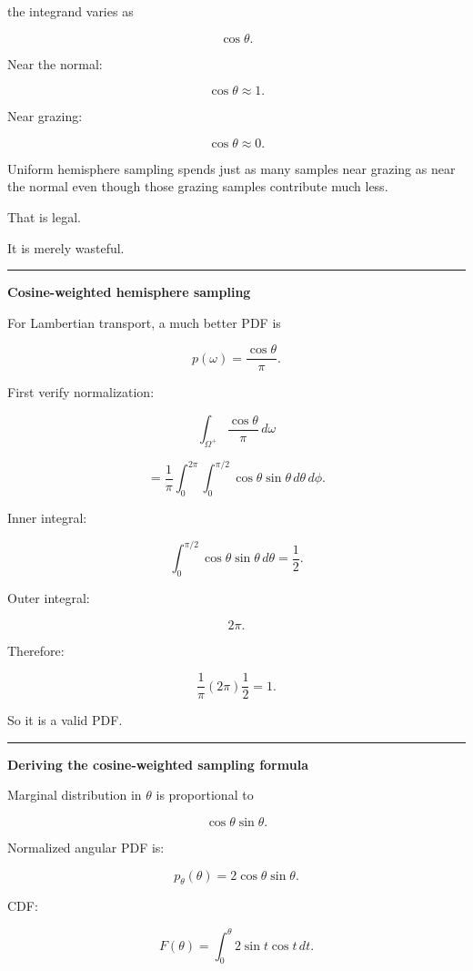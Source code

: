 the integrand varies as

\[
\cos\theta.
\]

Near the normal:

\[
\cos\theta\approx1.
\]

Near grazing:

\[
\cos\theta\approx0.
\]

Uniform hemisphere sampling spends just as many samples near grazing as near the normal even though those grazing samples contribute much less.

That is legal.

It is merely wasteful.

\begin{center}\rule{0.5\linewidth}{0.5pt}\end{center}

\textbf{Cosine-weighted hemisphere sampling}

For Lambertian transport, a much better PDF is

\[
\boxed{
p(\omega)
=
\frac{\cos\theta}{\pi}.
}
\]

First verify normalization:

\[
\int_{\Omega^+}
\frac{\cos\theta}{\pi}
\,d\omega
\]

\[
=
\frac1\pi
\int_0^{2\pi}
\int_0^{\pi/2}
\cos\theta
\sin\theta
\,d\theta\,d\phi.
\]

Inner integral:

\[
\int_0^{\pi/2}
\cos\theta\sin\theta\,d\theta
=
\frac12.
\]

Outer integral:

\[
2\pi.
\]

Therefore:

\[
\frac1\pi
(2\pi)
\frac12
=
1.
\]

So it is a valid PDF.

\begin{center}\rule{0.5\linewidth}{0.5pt}\end{center}

\textbf{Deriving the cosine-weighted sampling formula}

Marginal distribution in \(\theta\) is proportional to

\[
\cos\theta\sin\theta.
\]

Normalized angular PDF is:

\[
p_\theta(\theta)
=
2\cos\theta\sin\theta.
\]

CDF:

\[
F(\theta)
=
\int_0^\theta
2\sin t\cos t\,dt.
\]

